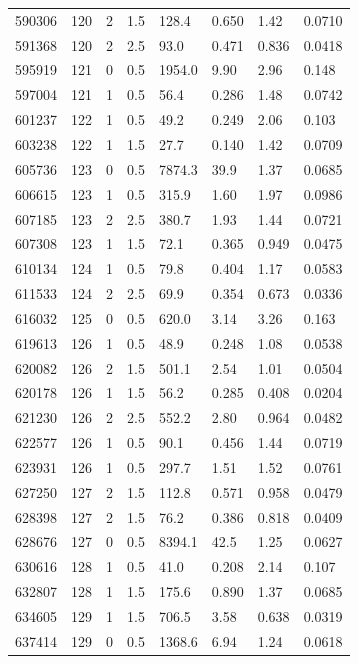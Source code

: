 \documentclass[preview]{standalone}
\begin{document}
{{{{{{{{{\begin{tabular}{L{1.2cm}C{1.2cm} C{0.3cm}C{0.5cm} C{1.4cm}C{1.4cm} C{1.4cm}C{1.4cm}}
  590306  &   120  & 2     & 1.5 &  128.4  & 0.650  & 1.42 &  0.0710   \\ 
  591368  &   120  & 2     & 2.5 &  93.0  & 0.471  & 0.836 &  0.0418   \\ 
  595919  &   121  & 0     & 0.5 &  1954.0  & 9.90  & 2.96 &  0.148   \\ 
  597004  &   121  & 1     & 0.5 &  56.4  & 0.286  & 1.48 &  0.0742   \\ 
  601237  &   122  & 1     & 0.5 &  49.2  & 0.249  & 2.06 &  0.103   \\ 
  603238  &   122  & 1     & 1.5 &  27.7  & 0.140  & 1.42 &  0.0709   \\ 
  605736  &   123  & 0     & 0.5 &  7874.3  & 39.9  & 1.37 &  0.0685   \\ 
  606615  &   123  & 1     & 0.5 &  315.9  & 1.60  & 1.97 &  0.0986   \\ 
  607185  &   123  & 2     & 2.5 &  380.7  & 1.93  & 1.44 &  0.0721   \\ 
  607308  &   123  & 1     & 1.5 &  72.1  & 0.365  & 0.949 &  0.0475   \\ 
  610134  &   124  & 1     & 0.5 &  79.8  & 0.404  & 1.17 &  0.0583   \\ 
  611533  &   124  & 2     & 2.5 &  69.9  & 0.354  & 0.673 &  0.0336   \\ 
  616032  &   125  & 0     & 0.5 &  620.0  & 3.14  & 3.26 &  0.163   \\ 
  619613  &   126  & 1     & 0.5 &  48.9  & 0.248  & 1.08 &  0.0538   \\ 
  620082  &   126  & 2     & 1.5 &  501.1  & 2.54  & 1.01 &  0.0504   \\ 
  620178  &   126  & 1     & 1.5 &  56.2  & 0.285  & 0.408 &  0.0204   \\ 
  621230  &   126  & 2     & 2.5 &  552.2  & 2.80  & 0.964 &  0.0482   \\ 
  622577  &   126  & 1     & 0.5 &  90.1  & 0.456  & 1.44 &  0.0719   \\ 
  623931  &   126  & 1     & 0.5 &  297.7  & 1.51  & 1.52 &  0.0761   \\ 
  627250  &   127  & 2     & 1.5 &  112.8  & 0.571  & 0.958 &  0.0479   \\ 
  628398  &   127  & 2     & 1.5 &  76.2  & 0.386  & 0.818 &  0.0409   \\ 
  628676  &   127  & 0     & 0.5 &  8394.1  & 42.5  & 1.25 &  0.0627   \\ 
  630616  &   128  & 1     & 0.5 &  41.0  & 0.208  & 2.14 &  0.107   \\ 
  632807  &   128  & 1     & 1.5 &  175.6  & 0.890  & 1.37 &  0.0685   \\ 
  634605  &   129  & 1     & 1.5 &  706.5  & 3.58  & 0.638 &  0.0319   \\ 
  637414  &   129  & 0     & 0.5 &  1368.6  & 6.94  & 1.24 &  0.0618   \\ 
\hline 
\end{tabular} 

}}}}}}}}}
\end{document}
